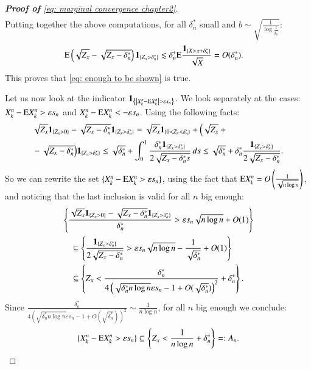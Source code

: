 \begin{proof}[\hypertarget{proof of lemma 2}{\textbf{Proof of}} \eqref{eq: marginal convergence chapter2}]
\begin{align*}
\end{align*}
Putting together the above computations, for all $\delta^*_n$ small and $b \sim \sqrt{\frac{1}{\log{\frac{1}{\delta^*_n}}}}$:
\begin{align*}
    &\mathrm{E} \left(\sqrt{Z_x}-\sqrt{Z_x-\delta^*_n}\right) \mathbf{1}_{\{Z_x>\delta^*_n\}} \lesssim \delta^*_n \mathrm{E}  \frac{\mathbf{1}_{\{X > x + \delta^*_n \}}}{\sqrt{X}} = O(\delta^*_n).
\end{align*}
This proves that \eqref{eq: enough to be shown} is true. 

Let us now look at the indicator $\ind_{\left\{\left|X^n_k-\ex X^n_k\right|>\varepsilon s_n\right\}}$. We look separately at the cases: $ X^n_k-\mathrm{E} X^n_k > \varepsilon s_n$ and $X^n_k-\mathrm{E} X^n_k < - \varepsilon s_n$. Using the following facts:
\begin{align*}
    &\sqrt{Z_x} \mathbf{1}_{\{Z_x > 0 \}} - \sqrt{Z_x - \delta^*_n} \mathbf{1}_{\{Z_x > \delta^*_n \}} = \sqrt{Z_x} \mathbf{1}_{\{ 0 < Z_x < \delta^*_n\}} + \Big( \sqrt{Z_x} \: +\\
    &   - \sqrt{Z_x - \delta^*_n} \Big) \mathbf{1}_{\{Z_x > \delta^*_n \}} \leq \sqrt{\delta^*_n} + \int_{0}^{1} \frac{\delta^*_n \mathbf{1}_{\{Z_x > \delta^*_n \}}}{2 \sqrt{Z_x - \delta^*_n s}} \, ds \leq \sqrt{\delta^*_n} + \delta^*_n \frac{ \mathbf{1}_{\{Z_x > \delta^*_n \}}}{2 \sqrt{Z_x - \delta^*_n }}.
\end{align*}
So we can rewrite the set $ \{X^n_k-\mathrm{E} X^n_k > \varepsilon s_n \}$, using the fact that $\mathrm{E} X_k^n = O\left( \frac{1}{\sqrt{n \log{n}}} \right)$, and noticing that the last inclusion is valid for all $n$ big enough:
\begin{align*}
    &\left\{ \frac{\sqrt{Z_x} \mathbf{1}_{\{Z_x > 0 \}} - \sqrt{Z_x - \delta^*_n} \mathbf{1}_{\{Z_x > \delta^*_n \}}}{ \delta^*_n} > \varepsilon s_n \sqrt{n \log{n}}  + O(1) \right\} \\
    & \quad \subseteq \left\{ \frac{\mathbf{1}_{\{Z_x > \delta^*_n \}}}{2 \sqrt{Z_x - \delta^*_n}} > \varepsilon s_n \sqrt{n \log{n}} - \frac{1}{\sqrt{\delta^*_n}} + O(1) \right\} \\
    & \quad \subseteq \left\{ Z_x < \frac{\delta^*_n}{4\left( \sqrt{\delta^*_n n \log{n}} \varepsilon s_n - 1 + O(\sqrt{\delta^*_n}) \right)^2} + \delta^*_n \right\}.
\end{align*}
Since $\frac{\delta^*_n}{4\left( \sqrt{\delta^*_n n \log{n}} \varepsilon s_n - 1 + O(\sqrt{\delta^*_n}) \right)^2} \sim \frac{1}{n \log{n}}$, for all $n$ big enough we conclude:
\begin{align*}
    \{X^n_k-\ex X^n_k > \varepsilon s_n \} \subseteq \left\{ Z_x < \frac{1}{n\log{n}} + \delta^*_n \right\} =: A_n.

\end{align*}
\end{proof}
